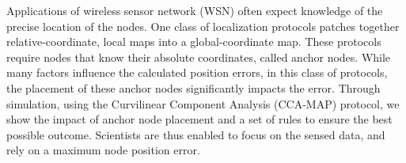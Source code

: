 Applications of wireless sensor network (WSN) often expect knowledge of the precise location of the nodes. One class of localization protocols patches together relative-coordinate, local maps into a global-coordinate map.  These protocols require nodes that know their absolute coordinates, called anchor nodes.  While many factors influence the calculated position errors, in this class of protocols, the placement of these anchor nodes significantly impacts the error.  Through simulation, using the Curvilinear Component Analysis (CCA-MAP) protocol, we show the impact of anchor node placement and a set of rules to ensure the best possible outcome.  Scientists are thus enabled to focus on the sensed data, and rely on a maximum node position error.
